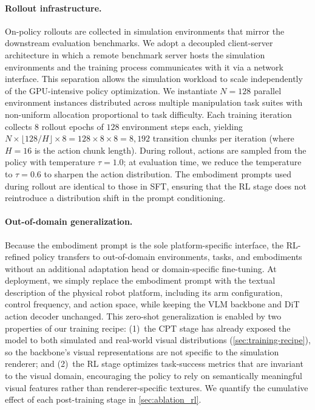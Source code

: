 \documentclass{llmxive}
\begin{document}
\paragraph{Rollout infrastructure.}
On-policy rollouts are collected in simulation environments that mirror the downstream evaluation benchmarks.
We adopt a decoupled client-server architecture in which a remote benchmark server hosts the simulation environments and the training process communicates with it via a network interface.
This separation allows the simulation workload to scale independently of the GPU-intensive policy optimization.
We instantiate $N{=}128$ parallel environment instances distributed across multiple manipulation task suites with non-uniform allocation proportional to task difficulty.
Each training iteration collects $8$ rollout epochs of $128$ environment steps each, yielding $N \times \lfloor 128/H \rfloor \times 8 = 128 \times 8 \times 8 = 8{,}192$ transition chunks per iteration (where $H{=}16$ is the action chunk length).
During rollout, actions are sampled from the policy with temperature $\tau{=}1.0$; at evaluation time, we reduce the temperature to $\tau{=}0.6$ to sharpen the action distribution.
The embodiment prompts used during rollout are identical to those in SFT, ensuring that the RL stage does not reintroduce a distribution shift in the prompt conditioning.

\paragraph{Out-of-domain generalization.}
Because the embodiment prompt is the sole platform-specific interface, the RL-refined policy transfers to out-of-domain environments, tasks, and embodiments without an additional adaptation head or domain-specific fine-tuning.
At deployment, we simply replace the embodiment prompt with the textual description of the physical robot platform, including its arm configuration, control frequency, and action space, while keeping the VLM backbone and DiT action decoder unchanged.
This zero-shot generalization is enabled by two properties of our training recipe: (1)~the CPT stage has already exposed the model to both simulated and real-world visual distributions (\cref{sec:training-recipe}), so the backbone's visual representations are not specific to the simulation renderer; and (2)~the RL stage optimizes task-success metrics that are invariant to the visual domain, encouraging the policy to rely on semantically meaningful visual features rather than renderer-specific textures.
We quantify the cumulative effect of each post-training stage in \cref{sec:ablation_rl}.
\end{document}
